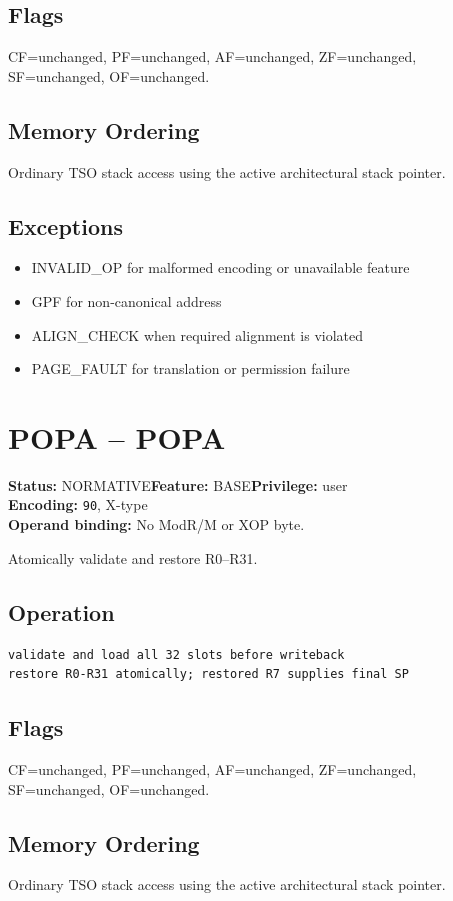 \documentclass[10pt]{article}
\begin{document}
\subsection*{Flags}
CF=unchanged, PF=unchanged, AF=unchanged, ZF=unchanged, SF=unchanged, OF=unchanged.
\subsection*{Memory Ordering}
Ordinary TSO stack access using the active architectural stack pointer.
\subsection*{Exceptions}
\begin{itemize}
\item INVALID\_OP for malformed encoding or unavailable feature
\item GPF for non-canonical address
\item ALIGN\_CHECK when required alignment is violated
\item PAGE\_FAULT for translation or permission failure
\end{itemize}
\clearpage

\section{POPA -- POPA}
\textbf{Status:} NORMATIVE\quad \textbf{Feature:} BASE\quad \textbf{Privilege:} user\\
\textbf{Encoding:} \texttt{90}, X-type\\
\textbf{Operand binding:} No ModR/M or XOP byte.

Atomically validate and restore R0--R31.

\subsection*{Operation}
\begin{lstlisting}
validate and load all 32 slots before writeback
restore R0-R31 atomically; restored R7 supplies final SP
\end{lstlisting}
\subsection*{Flags}
CF=unchanged, PF=unchanged, AF=unchanged, ZF=unchanged, SF=unchanged, OF=unchanged.
\subsection*{Memory Ordering}
Ordinary TSO stack access using the active architectural stack pointer.
\end{document}
